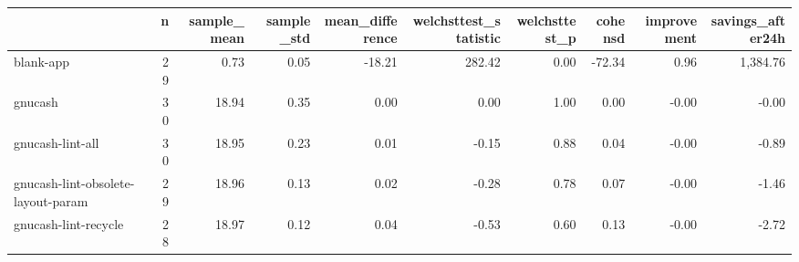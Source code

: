 \begin{tabular}{lrrrrrrrrr}
\toprule
{} &   n &  sample\_mean &  sample\_std &  mean\_difference &  welchsttest\_statistic &  welchsttest\_p &  cohensd &  improvement &  savings\_after24h \\
\midrule
blank-app                          &  29 &         0.73 &        0.05 &           -18.21 &                 282.42 &           0.00 &   -72.34 &         0.96 &          1,384.76 \\
gnucash                            &  30 &        18.94 &        0.35 &             0.00 &                   0.00 &           1.00 &     0.00 &        -0.00 &             -0.00 \\
gnucash-lint-all                   &  30 &        18.95 &        0.23 &             0.01 &                  -0.15 &           0.88 &     0.04 &        -0.00 &             -0.89 \\
gnucash-lint-obsolete-layout-param &  29 &        18.96 &        0.13 &             0.02 &                  -0.28 &           0.78 &     0.07 &        -0.00 &             -1.46 \\
gnucash-lint-recycle               &  28 &        18.97 &        0.12 &             0.04 &                  -0.53 &           0.60 &     0.13 &        -0.00 &             -2.72 \\
\bottomrule
\end{tabular}
